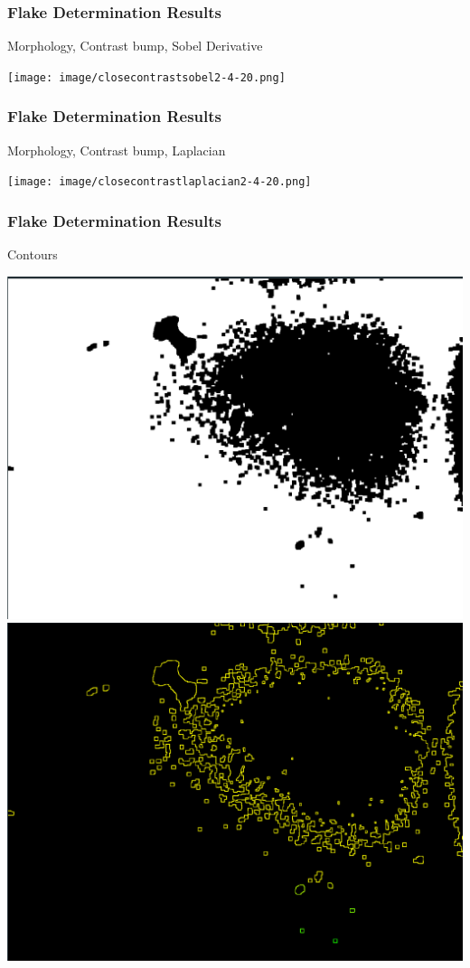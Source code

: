 \documentclass{beamer}
\begin{document}
\begin{frame}
	\frametitle{Flake Determination Results}
	Morphology, Contrast bump, Sobel Derivative
	\begin{center}
		\texttt{[image: image/closecontrastsobel2-4-20.png]}
	\end{center}
\end{frame}

\begin{frame}
	\frametitle{Flake Determination Results}
	Morphology, Contrast bump, Laplacian
	\begin{center}
		\texttt{[image: image/closecontrastlaplacian2-4-20.png]}
	\end{center}
\end{frame}

\begin{frame}
	\frametitle{Flake Determination Results}
	Contours
	\begin{center}
		\includegraphics[scale=0.13]{image/contourbefore.png}
		\includegraphics[scale=0.13]{image/contour.png}
	\end{center}
\end{frame}
\end{document}
